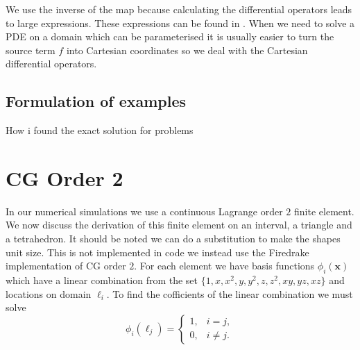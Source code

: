 \documentclass[12pt,a4paper]{article}
\begin{document}
We use the inverse of the map because calculating the differential operators leads to large expressions. These expressions can be found in \cite{}. When we need to solve a PDE on a domain which can be parameterised it is usually easier to turn the source term $f$ into Cartesian coordinates so we deal with the Cartesian differential operators.

\subsection{Formulation of examples}
How i found the exact solution for problems 
\section{CG Order 2}
In our numerical simulations we use a continuous Lagrange order $2$ finite element. We now discuss the derivation of this finite element on an interval, a triangle and a tetrahedron. It should be noted we can do a substitution to make the shapes unit size. This is not implemented in code we instead use the Firedrake implementation of CG order $2$.
For each element we have basis functions $\phi_i(\mathbf{x})$ which have a linear combination from the set $\{1, x, x^2, y, y^2, z, z^2, xy, yz, xz\}$ and locations on domain $\ell_i$.  To find the cofficients of the linear combination we must solve
\begin{equation} \label{CG_eq}
\phi_i(\ell_j) =
\begin{cases}
1, &i=j,\\
0, &i\neq j.
\end{cases}
\end{equation}
\end{document}
